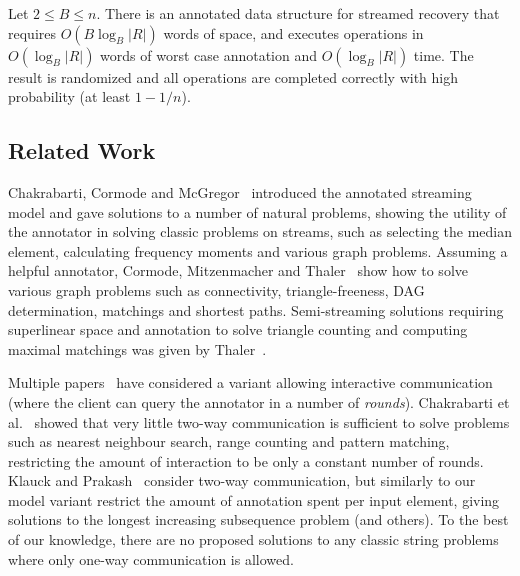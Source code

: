 \begin{theorem}\label{thm:annds}
    Let $2 \leq B \leq n$.  There is an annotated data structure for streamed recovery that requires $O(B \log_B |R|)$ words of space, and executes operations in $O(\log_B |R|)$ words of worst case annotation and $O(\log_B |R|)$ time. The result is randomized and all operations are completed correctly with high probability (at least $1-1/n$).
\end{theorem}

\subsection{Related Work}
Chakrabarti, Cormode and McGregor~\cite{chakrabarti2009annotations, chakrabarti2014annotations} introduced the annotated streaming model and gave solutions to a number of natural problems, showing the utility of the annotator in solving classic problems on streams, such as selecting the median element, calculating frequency moments and various graph problems. 
Assuming a helpful annotator, Cormode, Mitzenmacher and Thaler~\cite{cormode2013streaming} show how to solve various graph problems such as connectivity, triangle-freeness, DAG determination, matchings and shortest paths. Semi-streaming solutions requiring superlinear space and annotation to solve triangle counting and computing maximal matchings was given by Thaler~\cite{thaler2014semi}.

Multiple papers~\cite{cormode2012practical, klauck2014improved, chakrabarti2015verifiable, klauck2013streaming} have considered a variant allowing interactive communication (where the client can query the annotator in a number of \emph{rounds}).
Chakrabarti et al.~\cite{chakrabarti2015verifiable} showed that very little two-way communication is sufficient to solve problems such as nearest neighbour search, range counting and pattern matching, restricting the amount of interaction to be only a constant number of rounds. Klauck and Prakash~\cite{klauck2013streaming} consider two-way communication, but similarly to our model variant restrict the amount of annotation spent per input element, giving solutions to the longest increasing subsequence problem (and others). To the best of our knowledge, there are no proposed solutions to any classic string problems where only one-way communication is allowed.

